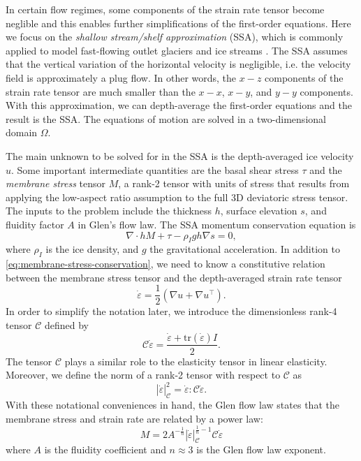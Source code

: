 \documentclass[twocolumn,letterpaper]{igs}
\begin{document}
In certain flow regimes, some components of the strain rate tensor become neglible and this enables further simplifications of the first-order equations.
Here we focus on the \emph{shallow stream/shelf approximation} (SSA), which is commonly applied to model fast-flowing outlet glaciers and ice streams \citep{greve2009dynamics}.
The SSA assumes that the vertical variation of the horizontal velocity is negligible, i.e. the velocity field is approximately a plug flow.
In other words, the $x-z$ components of the strain rate tensor are much smaller than the $x-x$, $x-y$, and $y-y$ components.
With this approximation, we can depth-average the first-order equations and the result is the SSA.
The equations of motion are solved in a two-dimensional domain $\Omega$.

The main unknown to be solved for in the SSA is the depth-averaged ice velocity $u$.
Some important intermediate quantities are the basal shear stress $\tau$ and the \emph{membrane stress} tensor $M$, a rank-2 tensor with units of stress that results from applying the low-aspect ratio assumption to the full 3D deviatoric stress tensor.
The inputs to the problem include the thickness $h$, surface elevation $s$, and fluidity factor $A$ in Glen's flow law.
The SSA momentum conservation equation is
\begin{equation}
    \nabla\cdot hM + \tau - \rho_I gh\nabla s = 0,
    \label{eq:membrane-stress-conservation}
\end{equation}
where $\rho_I$ is the ice density, and $g$ the gravitational acceleration.
In addition to \eqref{eq:membrane-stress-conservation}, we need to know a constitutive relation between the membrane stress tensor and the depth-averaged strain rate tensor
\begin{equation}
    \dot\varepsilon = \frac{1}{2}\left(\nabla u + \nabla u^\top\right).
    \label{eq:strain-rate}
\end{equation}
In order to simplify the notation later, we introduce the dimensionless rank-4 tensor $\mathscr{C}$ defined by
\begin{equation}
    \mathscr{C}\dot\varepsilon = \frac{\dot\varepsilon + \text{tr}(\dot\varepsilon)I}{2}.
    \label{eq:elasticity-tensor}
\end{equation}
The tensor $\mathscr{C}$ plays a similar role to the elasticity tensor in linear elasticity.
Moreover, we define the norm of a rank-2 tensor with respect to $\mathscr{C}$ as
\begin{equation}
    |\dot\varepsilon|_{\mathscr{C}}^2 = \dot\varepsilon : \mathscr{C}\dot\varepsilon.
\end{equation}
With these notational conveniences in hand, the Glen flow law states that the membrane stress and strain rate are related by a power law:
\begin{equation}
    M = 2A^{-\frac{1}{n}}|\dot\varepsilon|_{\mathscr C}^{\frac{1}{n} - 1}\mathscr{C}\dot\varepsilon
    \label{eq:constitutive-relation}
\end{equation}
where $A$ is the fluidity coefficient and $n \approx 3$ is the Glen flow law exponent.
\end{document}
